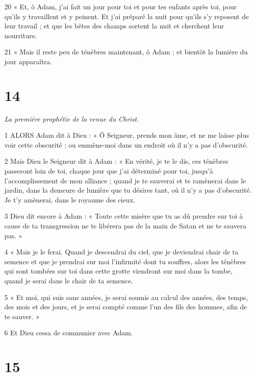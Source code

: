 \par 20 « Et, ô Adam, j'ai fait un jour pour toi et pour tes enfants après toi, pour qu'ils y travaillent et y peinent. Et j'ai préparé la nuit pour qu'ils s'y reposent de leur travail ; et que les bêtes des champs sortent la nuit et cherchent leur nourriture.

\par 21 « Mais il reste peu de ténèbres maintenant, ô Adam ; et bientôt la lumière du jour apparaîtra.

\chapter{14}

\par \textit{La première prophétie de la venue du Christ.}

\par 1 ALORS Adam dit à Dieu : « Ô Seigneur, prends mon âme, et ne me laisse plus voir cette obscurité ; ou emmène-moi dans un endroit où il n'y a pas d'obscurité.

\par 2 Mais Dieu le Seigneur dit à Adam : « En vérité, je te le dis, ces ténèbres passeront loin de toi, chaque jour que j'ai déterminé pour toi, jusqu'à l'accomplissement de mon alliance ; quand je te sauverai et te ramènerai dans le jardin, dans la demeure de lumière que tu désires tant, où il n'y a pas d'obscurité. Je t’y amènerai, dans le royaume des cieux.

\par 3 Dieu dit encore à Adam : « Toute cette misère que tu as dû prendre sur toi à cause de ta transgression ne te libérera pas de la main de Satan et ne te sauvera pas. »

\par 4 « Mais je le ferai. Quand je descendrai du ciel, que je deviendrai chair de ta semence et que je prendrai sur moi l'infirmité dont tu souffres, alors les ténèbres qui sont tombées sur toi dans cette grotte viendront sur moi dans la tombe, quand je serai dans le chair de ta semence.

\par 5 « Et moi, qui suis sans années, je serai soumis au calcul des années, des temps, des mois et des jours, et je serai compté comme l'un des fils des hommes, afin de te sauver. »

\par 6 Et Dieu cessa de communier avec Adam.

\chapter{15}

